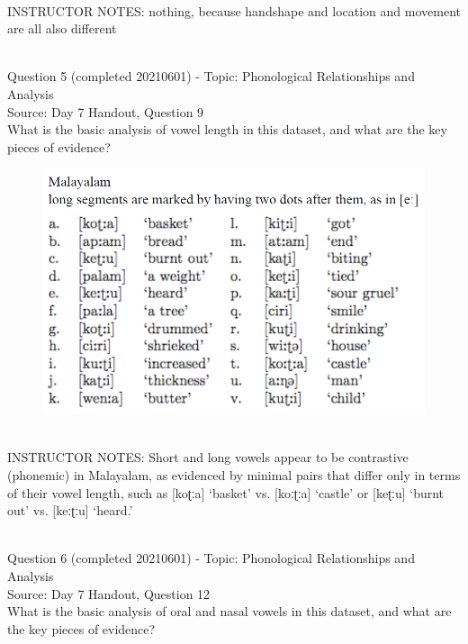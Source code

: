\documentclass[12pt]{article}
\begin{document}
~\\
INSTRUCTOR NOTES: nothing, because handshape and location and movement are all also different


~\\

{\large Question 5} (completed 20210601) - Topic: Phonological Relationships and Analysis\\
Source: Day 7 Handout, Question 9\\

What is the basic analysis of vowel length in this dataset, and what are the key pieces of evidence?\\

\begin{figure}[H]
\includegraphics{../images/malayalam.png}
\end{figure}

~\\
INSTRUCTOR NOTES: Short and long vowels appear to be contrastive (phonemic) in Malayalam, as evidenced by minimal pairs that differ only in terms of their vowel length, such as [koʈːa] ‘basket’ vs. [koːʈːa] ‘castle’ or [keʈːu] ‘burnt out’ vs. [keːʈːu] ‘heard.’


~\\

{\large Question 6} (completed 20210601) - Topic: Phonological Relationships and Analysis\\
Source: Day 7 Handout, Question 12\\

What is the basic analysis of oral and nasal vowels in this dataset, and what are the key pieces of evidence?\\
\end{document}
